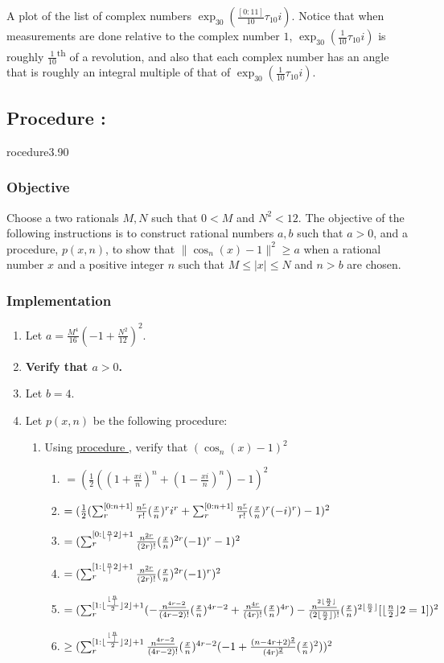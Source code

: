 \documentclass{article}
\let\mod\relax\DeclareMathOperator{\mod}{mod}
\newcommand{\ul}[1]{\protect\underline{#1}}
\newcounter{procedure}[part]
\newcommand{\procedure}[1]{\subsection*{Procedure \thepart:\theprocedure}\label{sec:procedure #1}\global\expandafter\edef\csname procedure#1\endcsname{\thepart:\theprocedure}\addtocounter{procedure}{1}}
\newcommand{\objective}{\subsubsection*{Objective}}
\newcommand{\implementation}{\subsubsection*{Implementation}}
\newcommand{\procedurehr}[1]{\hyperref[sec:procedure #1]{procedure \expandafter\csname procedure#1\endcsname}}
\begin{document}
	\begin{minipage}[c]{0.35\textwidth}
		A plot of the list of complex numbers $\exp_{30}(\frac{[0:11]}{10}\tau_{10}i)$. Notice that when measurements are done relative to the complex number $1$, $\exp_{30}(\frac{1}{10}\tau_{10}i)$ is roughly $\frac{1}{10}$\textsuperscript{th} of a revolution, and also that each complex number has an angle that is roughly an integral multiple of that of $\exp_{30}(\frac{1}{10}\tau_{10}i)$.
	\end{minipage}
	\begin{multicols}{2}
		\procedure{3.90}
			\objective
				Choose a two rationals $M,N$ such that $0<M$ and $N^2<12$. The objective of the following instructions is to construct rational numbers $a,b$ such that $a>0$, and a procedure, $p(x,n)$, to show that $\lVert\cos_n(x)-1\rVert^2\ge a$ when a rational number $x$ and a positive integer $n$ such that $M\le\lvert x\rvert\le N$ and $n>b$ are chosen.
			\implementation
				\begin{enumerate}
					\item Let $a=\frac{M^4}{16}(-1+\frac{N^2}{12})^2$.
					\item \textbf{Verify that $a>0$.}
					\item Let $b=4$.
					\item Let $p(x,n)$ be the following procedure:
					\begin{enumerate}
						\item Using \procedurehr{3.22}, verify that $(\cos_n(x)-1)^2$
						\begin{enumerate}
							\item $=(\frac{1}{2}((1+\frac{xi}{n})^n+(1-\frac{xi}{n})^n)-1)^2$
							\item $=(\frac{1}{2}(\sum_r^{[0:{n+1}]}\frac{n^{\ul{r}}}{r!}(\frac{x}{n})^ri^r+\sum_r^{[0:{n+1}]}\frac{n^{\ul{r}}}{r!}(\frac{x}{n})^r(-i)^r)-1)^2$
							\item $=(\sum_r^{[0:{\lfloor\frac{n}]}{2}\rfloor+1}\frac{n^{\ul{2r}}}{(2r)!}(\frac{x}{n})^{2r}(-1)^r-1)^2$
							\item $=(\sum_r^{[1:{\lfloor\frac{n}]}{2}\rfloor+1}\frac{n^{\ul{2r}}}{(2r)!}(\frac{x}{n})^{2r}(-1)^r)^2$
							\item $=(\sum_r^{[1:{\lfloor\frac{\lfloor\frac{n}]}{2}\rfloor}{2}\rfloor+1}(-\frac{n^{\ul{4r-2}}}{(4r-2)!}(\frac{x}{n})^{4r-2}+\frac{n^{\ul{4r}}}{(4r)!}(\frac{x}{n})^{4r})-\frac{n^{\ul{2\lfloor\frac{n}{2}\rfloor}}}{(2\lfloor\frac{n}{2}\rfloor)!}(\frac{x}{n})^{2\lfloor\frac{n}{2}\rfloor}[\lfloor\frac{n}{2}\rfloor\mod 2=1])^2$
							\item $\ge(\sum_r^{[1:{\lfloor\frac{\lfloor\frac{n}]}{2}\rfloor}{2}\rfloor+1}\frac{n^{\ul{4r-2}}}{(4r-2)!}(\frac{x}{n})^{4r-2}(-1+\frac{(n-4r+2)^{\ul{2}}}{(4r)^{\ul{2}}}(\frac{x}{n})^{2}))^2$

\end{enumerate}
\end{enumerate}
\end{enumerate}
\end{multicols}
\end{document}
